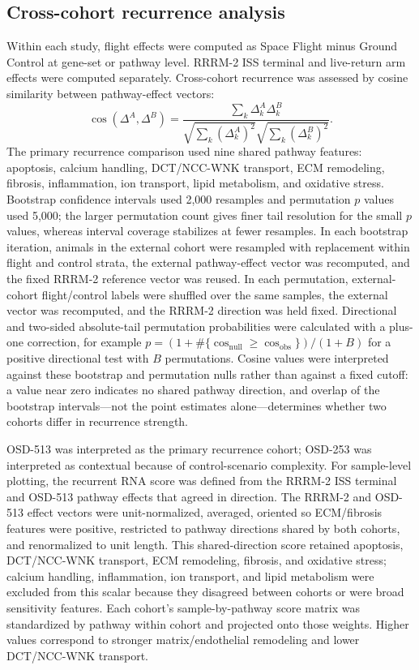 \documentclass[11pt]{article}
\begin{document}
\subsection{Cross-cohort recurrence analysis}

Within each study, flight effects were computed as Space Flight minus Ground Control at gene-set or pathway level. RRRM-2 ISS terminal and live-return arm effects were computed separately. Cross-cohort recurrence was assessed by cosine similarity between pathway-effect vectors:
\[
\cos(\Delta^{A},\Delta^{B})=
\frac{\sum_{k}\Delta_{k}^{A}\Delta_{k}^{B}}
{\sqrt{\sum_k(\Delta_{k}^{A})^2}\sqrt{\sum_k(\Delta_{k}^{B})^2}}.
\]
The primary recurrence comparison used nine shared pathway features: apoptosis, calcium handling, DCT/NCC-WNK transport, ECM remodeling, fibrosis, inflammation, ion transport, lipid metabolism, and oxidative stress. Bootstrap confidence intervals used 2,000 resamples and permutation $p$ values used 5,000; the larger permutation count gives finer tail resolution for the small $p$ values, whereas interval coverage stabilizes at fewer resamples. In each bootstrap iteration, animals in the external cohort were resampled with replacement within flight and control strata, the external pathway-effect vector was recomputed, and the fixed RRRM-2 reference vector was reused. In each permutation, external-cohort flight/control labels were shuffled over the same samples, the external vector was recomputed, and the RRRM-2 direction was held fixed. Directional and two-sided absolute-tail permutation probabilities were calculated with a plus-one correction, for example $p=(1+\#\{\cos_{\mathrm{null}}\geq \cos_{\mathrm{obs}}\})/(1+B)$ for a positive directional test with $B$ permutations. Cosine values were interpreted against these bootstrap and permutation nulls rather than against a fixed cutoff: a value near zero indicates no shared pathway direction, and overlap of the bootstrap intervals---not the point estimates alone---determines whether two cohorts differ in recurrence strength.

OSD-513 was interpreted as the primary recurrence cohort; OSD-253 was interpreted as contextual because of control-scenario complexity. For sample-level plotting, the recurrent RNA score was defined from the RRRM-2 ISS terminal and OSD-513 pathway effects that agreed in direction. The RRRM-2 and OSD-513 effect vectors were unit-normalized, averaged, oriented so ECM/fibrosis features were positive, restricted to pathway directions shared by both cohorts, and renormalized to unit length. This shared-direction score retained apoptosis, DCT/NCC-WNK transport, ECM remodeling, fibrosis, and oxidative stress; calcium handling, inflammation, ion transport, and lipid metabolism were excluded from this scalar because they disagreed between cohorts or were broad sensitivity features. Each cohort's sample-by-pathway score matrix was standardized by pathway within cohort and projected onto those weights. Higher values correspond to stronger matrix/endothelial remodeling and lower DCT/NCC-WNK transport.
\end{document}
